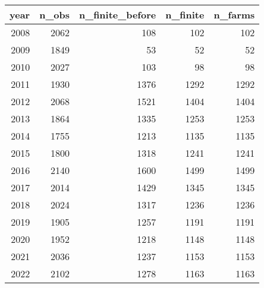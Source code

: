 \begin{tabular}{rrrrr}
\toprule
year & n_obs & n_finite_before & n_finite & n_farms \\
\midrule
2008 & 2062 & 108 & 102 & 102 \\
2009 & 1849 & 53 & 52 & 52 \\
2010 & 2027 & 103 & 98 & 98 \\
2011 & 1930 & 1376 & 1292 & 1292 \\
2012 & 2068 & 1521 & 1404 & 1404 \\
2013 & 1864 & 1335 & 1253 & 1253 \\
2014 & 1755 & 1213 & 1135 & 1135 \\
2015 & 1800 & 1318 & 1241 & 1241 \\
2016 & 2140 & 1600 & 1499 & 1499 \\
2017 & 2014 & 1429 & 1345 & 1345 \\
2018 & 2024 & 1317 & 1236 & 1236 \\
2019 & 1905 & 1257 & 1191 & 1191 \\
2020 & 1952 & 1218 & 1148 & 1148 \\
2021 & 2036 & 1237 & 1153 & 1153 \\
2022 & 2102 & 1278 & 1163 & 1163 \\
\bottomrule
\end{tabular}
